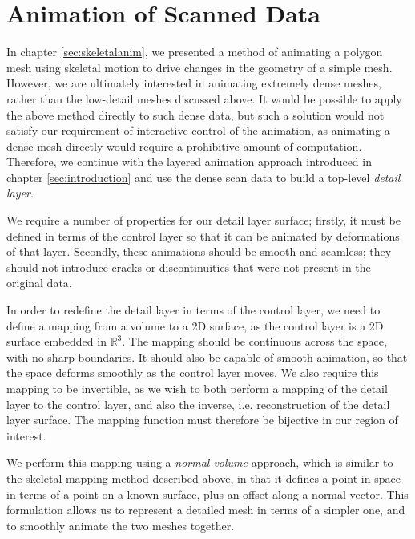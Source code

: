 \chapter{\label{sec:scandata} Animation of Scanned Data}

In chapter \ref{sec:skeletalanim}, we presented a method of animating a polygon mesh using skeletal motion to drive changes in the geometry of a simple mesh. However, we are ultimately interested in animating extremely dense meshes, rather than the low-detail meshes discussed above. It would be possible to apply the above method directly to such dense data, but such a solution would not satisfy our requirement of interactive control of the animation, as animating a dense mesh directly would require a prohibitive amount of computation. Therefore, we continue with the layered animation approach introduced in chapter \ref{sec:introduction} and use the dense scan data to build a top-level {\it detail layer}.

We require a number of properties for our detail layer surface; firstly, it must be defined in terms of the control layer so that it can be animated by deformations of that layer. Secondly, these animations should be smooth and seamless; they should not introduce cracks or discontinuities that were not present in the original data.

In order to redefine the detail layer in terms of the control layer, we need to define a mapping from a volume to a 2D surface, as the control layer is a 2D surface embedded in ${\mathbb R}^3$. The mapping should be continuous across the space, with no sharp boundaries. It should also be capable of smooth animation, so that the space deforms smoothly as the control layer moves. We also require this mapping to be invertible, as we wish to both perform a mapping of the detail layer to the control layer, and also the inverse, i.e. reconstruction of the detail layer surface. The mapping function must therefore be bijective in our region of interest.

We perform this mapping using a {\it normal volume} approach, which is similar to the skeletal mapping method described above, in that it defines a point in space in terms of a point on a known surface, plus an offset along a normal vector. This formulation allows us to represent a detailed mesh in terms of a simpler one, and to smoothly animate the two meshes together.

